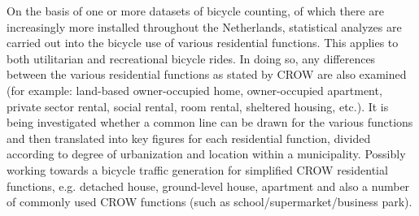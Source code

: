 On the basis of one or more datasets of bicycle counting, of which there are increasingly more installed throughout the Netherlands, statistical analyzes are carried out into the bicycle use of various residential functions. This applies to both utilitarian and recreational bicycle rides. In doing so, any differences between the various residential functions as stated by CROW are also examined (for example: land-based owner-occupied home, owner-occupied apartment, private sector rental, social rental, room rental, sheltered housing, etc.). It is being investigated whether a common line can be drawn for the various functions and then translated into key figures for each residential function, divided according to degree of urbanization and location within a municipality. Possibly working towards a bicycle traffic generation for simplified CROW residential functions, e.g. detached house, ground-level house, apartment and also a number of commonly used CROW functions (such as school/supermarket/business park).